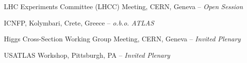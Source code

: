 \documentclass[11pt,letterpaper]{article}
\begin{document}
\begin{itemizetighter}
  \item LHC Experiments Committee (LHCC) Meeting, CERN, Geneva -- \emph{Open Session} 


  \item ICNFP, Kolymbari, Crete, Greece -- \emph{o.b.o. ATLAS} %


  \item Higgs Cross-Section Working Group Meeting, CERN, Geneva -- \emph{Invited Plenary}  %

    \item USATLAS Workshop, Pittsburgh, PA -- \emph{Invited Plenary}  %



\end{itemizetighter}
\end{document}
